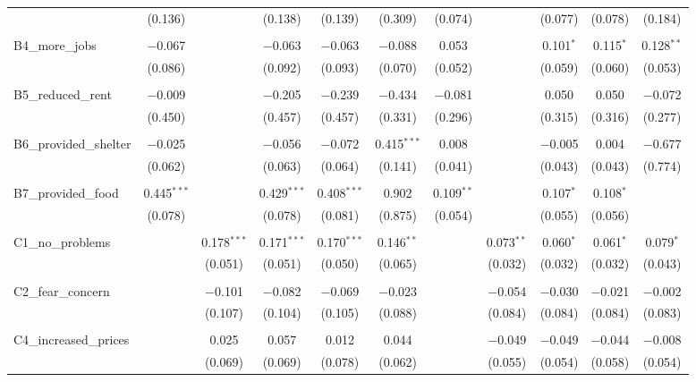 \begin{table}[H]
\begin{tabular}{@{\extracolsep{4pt}}lcccccccccc}
  & (0.136) &  & (0.138) & (0.139) & (0.309) & (0.074) &  & (0.077) & (0.078) & (0.184) \\ 
  & & & & & & & & & & \\ 
 B4\_more\_jobs & $-$0.067 &  & $-$0.063 & $-$0.063 & $-$0.088 & 0.053 &  & 0.101$^{*}$ & 0.115$^{*}$ & 0.128$^{**}$ \\ 
  & (0.086) &  & (0.092) & (0.093) & (0.070) & (0.052) &  & (0.059) & (0.060) & (0.053) \\ 
  & & & & & & & & & & \\ 
 B5\_reduced\_rent & $-$0.009 &  & $-$0.205 & $-$0.239 & $-$0.434 & $-$0.081 &  & 0.050 & 0.050 & $-$0.072 \\ 
  & (0.450) &  & (0.457) & (0.457) & (0.331) & (0.296) &  & (0.315) & (0.316) & (0.277) \\ 
  & & & & & & & & & & \\ 
 B6\_provided\_shelter & $-$0.025 &  & $-$0.056 & $-$0.072 & 0.415$^{***}$ & 0.008 &  & $-$0.005 & 0.004 & $-$0.677 \\ 
  & (0.062) &  & (0.063) & (0.064) & (0.141) & (0.041) &  & (0.043) & (0.043) & (0.774) \\ 
  & & & & & & & & & & \\ 
 B7\_provided\_food & 0.445$^{***}$ &  & 0.429$^{***}$ & 0.408$^{***}$ & 0.902 & 0.109$^{**}$ &  & 0.107$^{*}$ & 0.108$^{*}$ &  \\ 
  & (0.078) &  & (0.078) & (0.081) & (0.875) & (0.054) &  & (0.055) & (0.056) &  \\ 
  & & & & & & & & & & \\ 
 C1\_no\_problems &  & 0.178$^{***}$ & 0.171$^{***}$ & 0.170$^{***}$ & 0.146$^{**}$ &  & 0.073$^{**}$ & 0.060$^{*}$ & 0.061$^{*}$ & 0.079$^{*}$ \\ 
  &  & (0.051) & (0.051) & (0.050) & (0.065) &  & (0.032) & (0.032) & (0.032) & (0.043) \\ 
  & & & & & & & & & & \\ 
 C2\_fear\_concern &  & $-$0.101 & $-$0.082 & $-$0.069 & $-$0.023 &  & $-$0.054 & $-$0.030 & $-$0.021 & $-$0.002 \\ 
  &  & (0.107) & (0.104) & (0.105) & (0.088) &  & (0.084) & (0.084) & (0.084) & (0.083) \\ 
  & & & & & & & & & & \\ 
 C4\_increased\_prices &  & 0.025 & 0.057 & 0.012 & 0.044 &  & $-$0.049 & $-$0.049 & $-$0.044 & $-$0.008 \\ 
  &  & (0.069) & (0.069) & (0.078) & (0.062) &  & (0.055) & (0.054) & (0.058) & (0.054) \\ 

\end{tabular}
\end{table}
